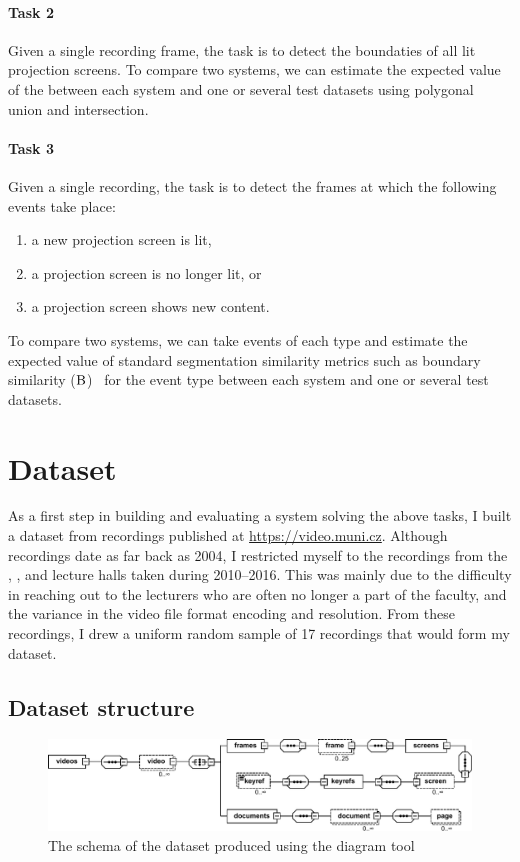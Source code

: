 \paragraph{Task 2} Given a single recording frame, the task is to detect the
boundaties of all lit projection screens. To compare two systems, we can
estimate the expected value of the  between each system and
one or several test datasets using polygonal union and intersection.

\paragraph{Task 3} Given a single recording, the task is to detect the frames
at which the following events take place:
\begin{enumerate}
  \item a new projection screen is lit,
  \item a projection screen is no longer lit, or
  \item a projection screen shows new content.
\end{enumerate}
To compare two systems, we can take events of each type and estimate the
expected value of standard segmentation similarity metrics such as boundary
similarity ($\textrm B$)~\cite{P13-1167} for the event type between each system
and one or several test datasets.

\section{Dataset}
As a first step in building and evaluating a system solving the above tasks, I
built a dataset from recordings published at \url{https://video.muni.cz}.
Although recordings date as far back as 2004, I restricted myself to the
recordings from the , , and  lecture halls taken
during 2010--2016. This was mainly due to the difficulty in reaching out to
the lecturers who are often no longer a part of the faculty, and the variance
in the video file format encoding and resolution. From these recordings, I drew
a uniform random sample of 17 recordings that would form my dataset.

\subsection{Dataset structure}

\begin{figure}
\includegraphics[width=\textwidth]{fig/schema}
\caption{The  schema of the dataset produced using the 
  diagram tool}
\end{figure}

